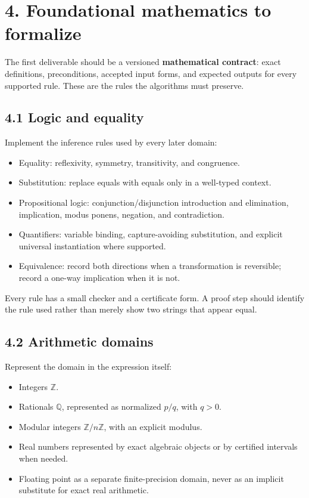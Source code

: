 \documentclass[
  10pt,
]{article}
\providecommand{\tightlist}{%
  \setlength{\itemsep}{0pt}\setlength{\parskip}{0pt}}
\begin{document}
\section{4. Foundational mathematics to
formalize}\label{foundational-mathematics-to-formalize}

The first deliverable should be a versioned \textbf{mathematical
contract}: exact definitions, preconditions, accepted input forms, and
expected outputs for every supported rule. These are the rules the
algorithms must preserve.

\subsection{4.1 Logic and equality}\label{logic-and-equality}

Implement the inference rules used by every later domain:

\begin{itemize}
\tightlist
\item
  Equality: reflexivity, symmetry, transitivity, and congruence.
\item
  Substitution: replace equals with equals only in a well-typed context.
\item
  Propositional logic: conjunction/disjunction introduction and
  elimination, implication, modus ponens, negation, and contradiction.
\item
  Quantifiers: variable binding, capture-avoiding substitution, and
  explicit universal instantiation where supported.
\item
  Equivalence: record both directions when a transformation is
  reversible; record a one-way implication when it is not.
\end{itemize}

Every rule has a small checker and a certificate form. A proof step
should identify the rule used rather than merely show two strings that
appear equal.

\subsection{4.2 Arithmetic domains}\label{arithmetic-domains}

Represent the domain in the expression itself:

\begin{itemize}
\tightlist
\item
  Integers \(\mathbb Z\).
\item
  Rationals \(\mathbb Q\), represented as normalized \(p/q\), with
  \(q>0\).
\item
  Modular integers \(\mathbb Z/n\mathbb Z\), with an explicit modulus.
\item
  Real numbers represented by exact algebraic objects or by certified
  intervals when needed.
\item
  Floating point as a separate finite-precision domain, never as an
  implicit substitute for exact real arithmetic.
\end{itemize}
\end{document}
